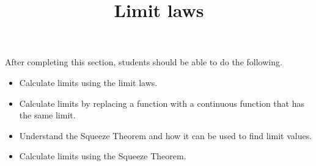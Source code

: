 \documentclass{ximera}
\title{Limit laws}
\begin{document}
\begin{abstract}
\end{abstract}

\maketitle

\begin{sectionOutcomes}
After completing this section, students should be able to do the following.

\begin{itemize}
\item Calculate limits using the limit laws.
 \item Calculate limits by replacing a function with a continuous
  function that has the same limit.
\item Understand the Squeeze Theorem and how it can be used to find limit values.
\item Calculate limits using the Squeeze Theorem.
\end{itemize}
\end{sectionOutcomes}
\end{document}

